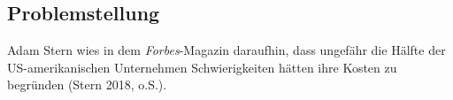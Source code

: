 \begin{comment} GELÖSCHT, WEIL DIESE EINE BEHAUPTUNG IST (25.10.2021)
    \\\\
    Für viele Unternehmen ist eine große Herausforderung, die Kosten von Cloud-Diensten übersichtlich zu halten und Optimierungsmöglichkeit leicht zu erkennen. Zusätzlich besteht die Gefahr, unangenehme Überraschungen in einer Rechnung zu bekommen, weil keine Grenze für den Konsum von Cloud-Diensten festgelegt wurde. 
    \end{comment}
\newpage    
\subsection{Problemstellung}
\begin{comment}
\\\\
”Heute hatten wir 17 Gäste für unsere derzeit 20 Zimmer. Für die kommende Messe am Wochenende sind wir bereit 500 Gäste zu empfangen. Nach der Messe werden wir mit unseren üblichen 20 Zimmern wie immer gut arbeiten können.”
Normalerweise bräuchte man eine große Investition zu machen, um solche kurzfristige Nachfrage zu erfüllen. Vergleichbar ist es bei traditionellen IT-Infrastrukturen, mehr Kapazitätsbedarf, würde die Anschaffung von einer neuen Hardware bedeuten.
\\\\
\end{comment}
Adam Stern wies in dem \textit{Forbes}-Magazin daraufhin, dass ungefähr die Hälfte der US-amerikanischen Unternehmen Schwierigkeiten hätten ihre Kosten zu begründen (Stern 2018, o.S.). 

